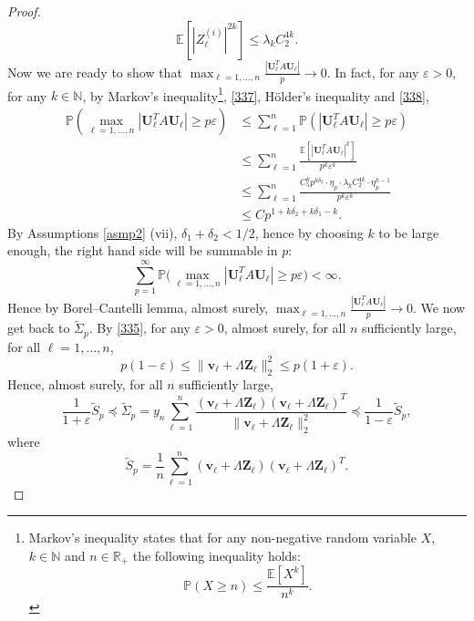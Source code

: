 \documentclass[a4paper,11pt]{article}
\theoremstyle{plain}
\theoremstyle{definition}
\newcommand{\ME}{\mathbb{E}}
\newcommand{\MR}{\mathbb{R}}
\newcommand{\MP}{\mathbb{P}}
\newcommand{\MN}{\mathbb{N}}
\begin{document}
\begin{proof}
    	\begin{equation} \label{338}
    		\ME[ |Z_\ell^{(i)}|^{2k} ] \leq \lambda_k C_2^{4k}.
    	\end{equation}
    	Now we are ready to show that $\max_{\ell = 1, \dots, n} \frac{| \mathbf{U}_\ell^T A \mathbf{U}_\ell |}{p} \rightarrow 0 $. In fact, for any $\varepsilon > 0$, for any $k \in \MN$, by Markov's inequality\footnote{
    		Markov's inequality states that for any non-negative random variable $X$, $k \in \MN$ and $n \in \MR_+$ the following inequality holds:
    		\[ \MP(X \geq n) \leq \frac{\ME[X^k]}{n^k}. \]
    		}, \eqref{337}, H\"older's inequality and \eqref{338},
    	\[ 
    	\begin{aligned}
    	\MP(\max_{\ell = 1, \dots, n} | \mathbf{U}_\ell^T A \mathbf{U}_\ell | \geq p\varepsilon) & \leq \sum_{\ell=1}^{n} \MP(|\mathbf{U}_\ell^T A \mathbf{U}_\ell | \geq p\varepsilon) \\
    	& \leq \sum_{\ell=1}^{n} \frac{\ME[ |\mathbf{U}_\ell^T A \mathbf{U}_\ell|^k ]}{ p^k \varepsilon^k } \\
    	& \leq \sum_{\ell=1}^{n} \frac{ C_5^k p^{k \delta_2}  \cdot \eta_p \cdot \lambda_k C_2^{4k} \cdot \eta_p^{k-1} }{p^k\varepsilon^k} \\
    	& \leq C p^{1+k\delta_2 + k\delta_1 - k}.
    	\end{aligned}
    	 \]
    	 By Assumptions \ref{asmp2} (vii), $\delta_1 + \delta_2 < 1/2$, hence by choosing $k$ to be large enough, the right hand side will be summable in $p$: 
    	 \[ \sum_{p=1}^{\infty} \MP\big(\max_{\ell = 1, \dots, n} | \mathbf{U}_\ell^T A \mathbf{U}_\ell | \geq p\varepsilon\big) < \infty. \]
    	 Hence by Borel–Cantelli lemma, almost surely, $\max_{\ell = 1, \dots, n} \frac{| \mathbf{U}_\ell^T A \mathbf{U}_\ell |}{p} \rightarrow 0$.
    	 We now get back to $\widetilde{\Sigma}_p$. By \eqref{335}, for any $\varepsilon > 0$, almost surely, for all $n$ sufficiently large, for all $\ell = 1, \dots, n$,
    	 \[ p(1-\varepsilon) \leq \| \mathbf{v}_\ell + \Lambda \mathbf{Z}_\ell \|_2^2 \leq p(1+\varepsilon). \]
    	 Hence, almost surely, for all $n$ sufficiently large,
    	 \[ \frac{1}{1+\varepsilon} \widetilde{S}_p \preceq \widetilde{\Sigma}_p = y_n \sum_{\ell=1}^{n} \frac{(\mathbf{v}_\ell + \Lambda \mathbf{Z}_\ell) (\mathbf{v}_\ell + \Lambda \mathbf{Z}_\ell)^T}{\|\mathbf{v}_\ell + \Lambda \mathbf{Z}_\ell\|_2^2} \preceq \frac{1}{1-\varepsilon} \widetilde{S}_p, \]
    	 where
    	 \[  \widetilde{S}_p = \frac{1}{n}\sum_{\ell=1}^{n} (\mathbf{v}_\ell + \Lambda \mathbf{Z}_\ell) (\mathbf{v}_\ell + \Lambda \mathbf{Z}_\ell)^T. \]

\end{proof}
\end{document}
